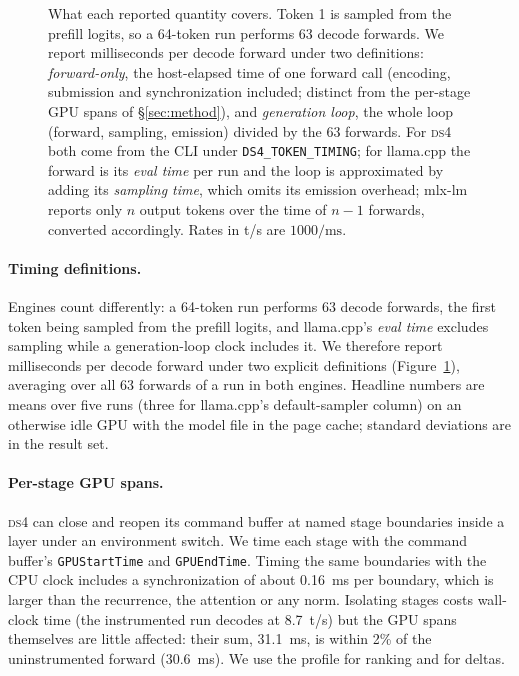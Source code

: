 \documentclass[11pt]{article}
\newcommand{\tps}{t/s}
\newcommand{\ds}{\textsc{ds4}}
\begin{document}
\begin{figure}[t]
\centering
\resizebox{\linewidth}{!}{}\par\vspace{0.5em}
\caption{What each reported quantity covers. Token 1 is sampled from the
prefill logits, so a 64-token run performs 63 decode forwards. We report
milliseconds per decode forward under two definitions: \emph{forward-only},
the host-elapsed time of one forward call (encoding, submission and
synchronization included; distinct from the per-stage GPU spans of
\S\ref{sec:method}), and \emph{generation loop}, the whole loop (forward,
sampling, emission) divided by the 63 forwards. For \ds{} both come from the
CLI under \texttt{DS4\_TOKEN\_TIMING}; for llama.cpp the forward is its
\emph{eval time} per run and the loop is approximated by adding its
\emph{sampling time}, which omits its emission overhead; mlx-lm reports only
$n$ output tokens over the time of $n-1$ forwards, converted accordingly.
Rates in \tps{} are $1000/\text{ms}$.}
\label{fig:timeline}
\end{figure}

\paragraph{Timing definitions.}
Engines count differently: a 64-token run performs 63 decode forwards, the
first token being sampled from the prefill logits, and llama.cpp's
\emph{eval time} excludes sampling while a generation-loop clock includes it.
We therefore report milliseconds per decode forward under two explicit
definitions (Figure~\ref{fig:timeline}), averaging over all 63 forwards of a
run in both engines. Headline numbers are means over five runs (three for
llama.cpp's default-sampler column) on an otherwise idle GPU with the model
file in the page cache; standard deviations are in the result set.

\paragraph{Per-stage GPU spans.}
\ds{} can close and reopen its command buffer at named stage boundaries inside
a layer under an environment switch. We time each stage with the command
buffer's \texttt{GPUStartTime} and \texttt{GPUEndTime}. Timing the same
boundaries with the CPU clock includes a synchronization of about 0.16~ms per
boundary, which is larger than the recurrence, the attention or any norm.
Isolating stages costs wall-clock time (the instrumented run decodes at
8.7~\tps{}) but the GPU spans themselves are little affected: their sum,
31.1~ms, is within 2\% of the uninstrumented forward (30.6~ms). We use the
profile for ranking and for deltas.
\end{document}

